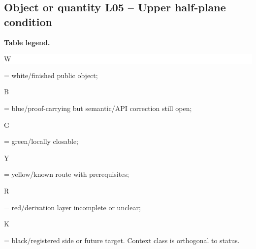 \subsection*{Object or quantity L05 -- Upper half-plane condition}
\hypertarget{objproof:L05}{}
\par\smallskip\noindent\begin{minipage}{0.99\linewidth}\footnotesize\raggedright\textbf{Table legend.} \colorbox{white}{\strut W} = white/finished public object; \colorbox{cyan!20}{\strut B} = blue/proof-carrying but semantic/API correction still open; \colorbox{green!18}{\strut G} = green/locally closable; \colorbox{yellow!25}{\strut Y} = yellow/known route with prerequisites; \colorbox{red!20}{\strut R} = red/derivation layer incomplete or unclear; \colorbox{black!18}{\strut K} = black/registered side or future target. Context class is orthogonal to status.\end{minipage}\par\vspace{0.25em}
